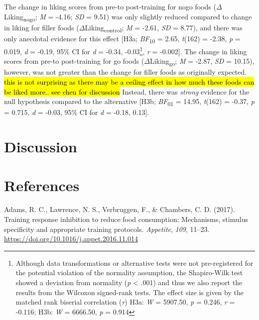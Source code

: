 \documentclass[man,floatsintext]{apa6}
\let\rmarkdownfootnote\footnote%
\def\footnote{\protect\rmarkdownfootnote}
\begin{document}
The change in liking scores from pre-to post-training for nogo foods (\(\Delta\)Liking\textsubscript{nogo}; \emph{M} = -4.16; \emph{SD} = 9.51) was only slightly reduced compared to change in liking for filler foods (\(\Delta\)Liking\textsubscript{control}; \emph{M} = -2.61, \emph{SD} = 8.77), and there was only anecdotal evidence for this effect {[}H3a; \emph{BF}\textsubscript{10} = 2.65, \emph{t}(162) = -2.38, \emph{p} = 0.019, \emph{d} = -0.19, 95\% CI for \emph{d} = -0.34, -0.03\footnote{Although data transformations or alternative tests were not pre-registered for the potential violation of the normality assumption, the Shapiro-Wilk test showed a deviation from normality (\textit{p} < .001) and thus we also report the results from the Wilcoxon signed-rank tests. The effect size is given by the matched rank biserial correlation (\textit{r}) H3a: \textit{W} = 5907.50, \textit{p} = 0.246, \textit{r} = -0.116; H3b: \textit{W} = 6666.50, \textit{p} = 0.914}, \textit{r} = -0.002{]}. The change in liking scores from pre-to post-training for go foods (\(\Delta\)Liking\textsubscript{go}; \emph{M} = -2.87, \emph{SD} = 10.15), however, was not greater than the change for filler foods as originally expected. \hl{this is not surprising as there may be a ceiling effect in how much these foods can be liked more.. see chen for discussion} Instead, there was \emph{strong} evidence for the null hypothesis compared to the alternative {[}H3b; \emph{BF}\textsubscript{01} = 14.95, \emph{t}(162) = -0.37, \emph{p} = 0.715, \emph{d} = -0.03, 95\% CI for \emph{d} = -0.18, 0.13{]}.

\hypertarget{discussion}{%
\section{Discussion}\label{discussion}}

\newpage



\hypertarget{references}{%
\section{References}\label{references}}

\begingroup
\setlength{\parindent}{-0.5in}
\setlength{\leftskip}{0.5in}

\hypertarget{refs}{}
\leavevmode\hypertarget{ref-adams_training_2017}{}%
Adams, R. C., Lawrence, N. S., Verbruggen, F., \& Chambers, C. D. (2017). Training response inhibition to reduce food consumption: Mechanisms, stimulus specificity and appropriate training protocols. \emph{Appetite}, \emph{109}, 11--23. \url{https://doi.org/10.1016/j.appet.2016.11.014}
\end{document}
